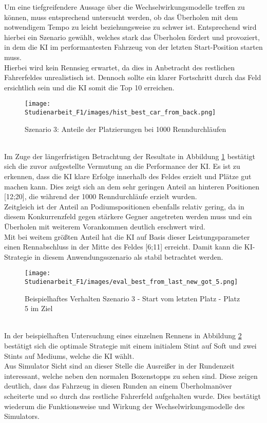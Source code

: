Um eine tiefgreifendere Aussage über die Wechselwirkungsmodelle treffen zu können, muss entsprechend untersucht werden, ob das Überholen mit dem notwendigem Tempo zu leicht beziehungsweise zu schwer ist. Entsprechend wird hierbei ein Szenario gewählt, welches stark das Überholen fördert und provoziert, in dem die KI im performantesten Fahrzeug von der letzten Start-Position starten muss.\\
Hierbei wird kein Rennsieg erwartet, da dies in Anbetracht des restlichen Fahrerfeldes unrealistisch ist. Dennoch sollte ein klarer Fortschritt durch das Feld ersichtlich sein und die KI somit die Top 10 erreichen.
\\
\begin{figure}
    \centering
    \texttt{[image: Studienarbeit\_F1/images/hist\_best\_car\_from\_back.png]}
    \caption{Szenario 3: Anteile der Platzierungen bei 1000 Renndurchläufen}
    \label{fig:hist_best_car_from_back}
\end{figure}
\\
Im Zuge der längerfristigen Betrachtung der Resultate in Abbildung \ref{fig:hist_best_car_from_back} bestätigt sich die zuvor aufgestellte Vermutung an die Performance der KI. Es ist zu erkennen, dass die KI klare Erfolge innerhalb des Feldes erzielt und Plätze gut machen kann. Dies zeigt sich an dem sehr geringen Anteil an hinteren Positionen [12;20], die während der 1000 Renndurchläufe erzielt wurden.\\
Zeitgleich ist der Anteil an Podiumspositionen ebenfalls relativ gering, da in diesem Konkurrenzfeld gegen stärkere Gegner angetreten werden muss und ein Überholen mit weiterem Vorankommen deutlich erschwert wird.\\
Mit bei weitem größten Anteil hat die KI auf Basis dieser Leistungsparameter einen Rennabschluss in der Mitte des Feldes [6;11] erreicht. Damit kann die KI-Strategie in diesem Anwendungsszenario als stabil betrachtet werden.
\\
\begin{figure}
    \texttt{[image: Studienarbeit\_F1/images/eval\_best\_from\_last\_new\_got\_5.png]}
    \caption{Beispielhaftes Verhalten Szenario 3 - Start vom letzten Platz - Platz 5 im Ziel}
    \label{fig:example_scenario_three}
\end{figure}
\\
In der beispielhaften Untersuchung eines einzelnen Rennens in Abbildung \ref{fig:example_scenario_three} bestätigt sich die optimale Strategie mit einem initialem Stint auf Soft und zwei Stints auf Mediums, welche die KI wählt.\\
Aus Simulator Sicht sind an dieser Stelle die Ausreißer in der Rundenzeit interessant, welche neben den normalen Boxenstopps zu sehen sind. Diese zeigen deutlich, dass das Fahrzeug in diesen Runden an einem Überholmanöver scheiterte und so durch das restliche Fahrerfeld aufgehalten wurde. Dies bestätigt wiederum die Funktionsweise und Wirkung der Wechselwirkungsmodelle des Simulators.


